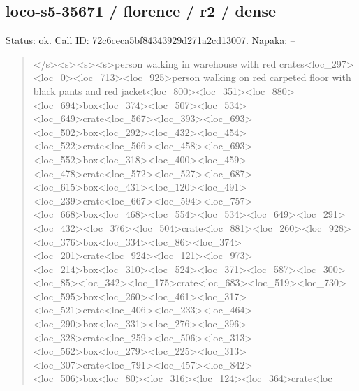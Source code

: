 \documentclass[10pt,a4paper]{article}
\begin{document}
\subsection*{loco-s5-35671 / florence / r2 / dense}
Status: ok. Call ID: 72c6ceca5bf84343929d271a2cd13007. Napaka: --
\begin{quote}\footnotesize
</s>\allowbreak{}<s>\allowbreak{}<s>\allowbreak{}<s>\allowbreak{}person walking in warehouse with red crates<loc\_297>\allowbreak{}<loc\_0>\allowbreak{}<loc\_713>\allowbreak{}<\allowbreak{}loc\_925>\allowbreak{}person walking on red carpeted floor with black pants and red jacket<loc\_800>\allowbreak{}<loc\_351>\allowbreak{}<loc\_880\allowbreak{}>\allowbreak{}<loc\_694>\allowbreak{}box<loc\_374>\allowbreak{}<loc\_507>\allowbreak{}<\allowbreak{}loc\_534>\allowbreak{}<loc\_649>\allowbreak{}crate<loc\_567>\allowbreak{}<\allowbreak{}loc\_393>\allowbreak{}<loc\_693>\allowbreak{}<loc\_502>\allowbreak{}box<lo\allowbreak{}c\_292>\allowbreak{}<loc\_432>\allowbreak{}<loc\_454>\allowbreak{}<loc\_522\allowbreak{}>\allowbreak{}crate<loc\_566>\allowbreak{}<loc\_458>\allowbreak{}<loc\_693\allowbreak{}>\allowbreak{}<loc\_552>\allowbreak{}box<loc\_318>\allowbreak{}<loc\_400>\allowbreak{}<\allowbreak{}loc\_459>\allowbreak{}<loc\_478>\allowbreak{}crate<loc\_572>\allowbreak{}<\allowbreak{}loc\_527>\allowbreak{}<loc\_687>\allowbreak{}<loc\_615>\allowbreak{}box<lo\allowbreak{}c\_431>\allowbreak{}<loc\_120>\allowbreak{}<loc\_491>\allowbreak{}<loc\_239\allowbreak{}>\allowbreak{}crate<loc\_667>\allowbreak{}<loc\_594>\allowbreak{}<loc\_757\allowbreak{}>\allowbreak{}<loc\_668>\allowbreak{}box<loc\_468>\allowbreak{}<loc\_554>\allowbreak{}<\allowbreak{}loc\_534>\allowbreak{}<loc\_649>\allowbreak{}<loc\_291>\allowbreak{}<loc\_4\allowbreak{}32>\allowbreak{}<loc\_376>\allowbreak{}<loc\_504>\allowbreak{}crate<loc\_8\allowbreak{}81>\allowbreak{}<loc\_260>\allowbreak{}<loc\_928>\allowbreak{}<loc\_376>\allowbreak{}bo\allowbreak{}x<loc\_334>\allowbreak{}<loc\_86>\allowbreak{}<loc\_374>\allowbreak{}<loc\_\allowbreak{}201>\allowbreak{}crate<loc\_924>\allowbreak{}<loc\_121>\allowbreak{}<loc\_\allowbreak{}973>\allowbreak{}<loc\_214>\allowbreak{}box<loc\_310>\allowbreak{}<loc\_52\allowbreak{}4>\allowbreak{}<loc\_371>\allowbreak{}<loc\_587>\allowbreak{}<loc\_300>\allowbreak{}<lo\allowbreak{}c\_85>\allowbreak{}<loc\_342>\allowbreak{}<loc\_175>\allowbreak{}crate<loc\allowbreak{}\_683>\allowbreak{}<loc\_519>\allowbreak{}<loc\_730>\allowbreak{}<loc\_595>\allowbreak{}\allowbreak{}box<loc\_260>\allowbreak{}<loc\_461>\allowbreak{}<loc\_317>\allowbreak{}<l\allowbreak{}oc\_521>\allowbreak{}crate<loc\_406>\allowbreak{}<loc\_233>\allowbreak{}<l\allowbreak{}oc\_464>\allowbreak{}<loc\_290>\allowbreak{}box<loc\_331>\allowbreak{}<loc\allowbreak{}\_276>\allowbreak{}<loc\_396>\allowbreak{}<loc\_328>\allowbreak{}crate<loc\allowbreak{}\_259>\allowbreak{}<loc\_506>\allowbreak{}<loc\_313>\allowbreak{}<loc\_562>\allowbreak{}\allowbreak{}box<loc\_279>\allowbreak{}<loc\_225>\allowbreak{}<loc\_313>\allowbreak{}<l\allowbreak{}oc\_307>\allowbreak{}crate<loc\_791>\allowbreak{}<loc\_457>\allowbreak{}<l\allowbreak{}oc\_842>\allowbreak{}<loc\_506>\allowbreak{}box<loc\_80>\allowbreak{}<loc\_\allowbreak{}316>\allowbreak{}<loc\_124>\allowbreak{}<loc\_364>\allowbreak{}crate<loc\_\allowbr
\end{quote}
\end{document}
